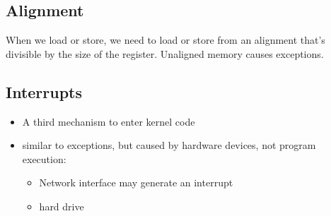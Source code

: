 \documentclass[12pt]{article}
\begin{document}
\subsection{Alignment}

When we load or store, we need to load or store from an alignment that's
divisible by the size of the register.  Unaligned memory causes exceptions.

\subsection{Interrupts}

\begin{itemize}
	\item A third mechanism to enter kernel code
	\item similar to exceptions, but caused by hardware devices, not program
		execution:
		\begin{itemize}
			\item Network interface may generate an interrupt
			\item hard drive
		\end{itemize}
\end{itemize}
\end{document}
